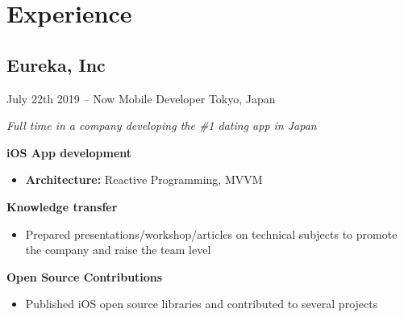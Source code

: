 \documentclass[]{template/friggeri-cv} %
\begin{document}

\section{Experience}



\subsection{Eureka, Inc}
\begin{entrylist}


\entry
{July 22th 2019 -- Now}
{Mobile Developer}
{Tokyo, Japan}
{\emph{Full time in a company developing the \#1 dating app in Japan}

\textbf{iOS App development} 
\begin{itemize}
\item \textbf{Architecture:} Reactive Programming, MVVM
\end{itemize}

\textbf{Knowledge transfer} 
\begin{itemize}
\item Prepared presentations/workshop/articles on technical subjects to promote the company and raise the team level

\end{itemize}

\textbf{Open Source Contributions} 
\begin{itemize}
\item Published iOS open source libraries and contributed to several projects

\end{itemize}


}
\end{entrylist}
\end{document}
